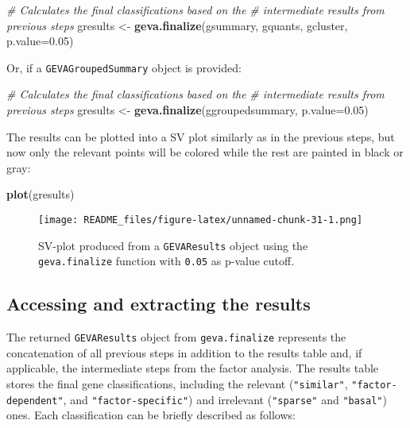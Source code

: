 \documentclass[
  12pt,
]{article}
\newenvironment{Shaded}{\begin{snugshade}}{\end{snugshade}}
\newcommand{\CommentTok}[1]{\textcolor[rgb]{0.56,0.35,0.01}{\textit{#1}}}
\newcommand{\DataTypeTok}[1]{\textcolor[rgb]{0.13,0.29,0.53}{#1}}
\newcommand{\FloatTok}[1]{\textcolor[rgb]{0.00,0.00,0.81}{#1}}
\newcommand{\KeywordTok}[1]{\textcolor[rgb]{0.13,0.29,0.53}{\textbf{#1}}}
\newcommand{\NormalTok}[1]{#1}
\newcommand{\StringTok}[1]{\textcolor[rgb]{0.31,0.60,0.02}{#1}}
\begin{document}
\begin{Shaded}
\begin{Highlighting}[]
\CommentTok{# Calculates the final classifications based on the}
\CommentTok{# intermediate results from previous steps}
\NormalTok{gresults <-}\StringTok{ }\KeywordTok{geva.finalize}\NormalTok{(gsummary, gquants, gcluster,}
                          \DataTypeTok{p.value=}\FloatTok{0.05}\NormalTok{)}
\end{Highlighting}
\end{Shaded}

Or, if a \texttt{GEVAGroupedSummary} object is provided:

\begin{Shaded}
\begin{Highlighting}[]
\CommentTok{# Calculates the final classifications based on the}
\CommentTok{# intermediate results from previous steps}
\NormalTok{gresults <-}\StringTok{ }\KeywordTok{geva.finalize}\NormalTok{(ggroupedsummary, }\DataTypeTok{p.value=}\FloatTok{0.05}\NormalTok{)}
\end{Highlighting}
\end{Shaded}

The results can be plotted into a SV plot similarly as in the previous
steps, but now only the relevant points will be colored while the rest
are painted in black or gray:

\begin{Shaded}
\begin{Highlighting}[]
\KeywordTok{plot}\NormalTok{(gresults)}
\end{Highlighting}
\end{Shaded}

\begin{figure}
\centering
\texttt{[image: README\_files/figure-latex/unnamed-chunk-31-1.png]}
\caption{SV-plot produced from a \texttt{GEVAResults} object using the
\texttt{geva.finalize} function with \texttt{0.05} as p-value cutoff.}
\end{figure}

\clearpage

\hypertarget{accessing-and-extracting-the-results}{%
\subsection{Accessing and extracting the
results}\label{accessing-and-extracting-the-results}}

The returned \texttt{GEVAResults} object from \texttt{geva.finalize}
represents the concatenation of all previous steps in addition to the
results table and, if applicable, the intermediate steps from the factor
analysis. The results table stores the final gene classifications,
including the relevant (\texttt{"similar"}, \texttt{"factor-dependent"},
and \texttt{"factor-specific"}) and irrelevant (\texttt{"sparse"} and
\texttt{"basal"}) ones. Each classification can be briefly described as
follows:
\end{document}
